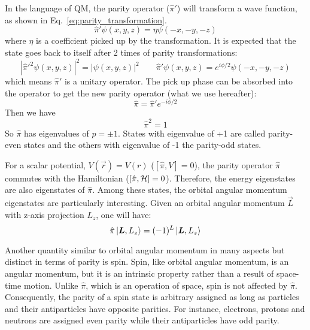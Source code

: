 In the language of QM, the parity operator ($\hat{\pi}'$) will transform 
a wave function, as shown in Eq.~\ref{eq:parity_transformation}.
\begin{equation}
    \hat{\pi}'\psi(x, y, z) = \eta \psi(-x, -y, -z)
    \label{eq:parity_transformation}
\end{equation}
where $\eta$ is a coefficient picked up by the transformation. It is expected that
the state goes back to itself after 2 times of parity transformations:
\begin{equation}
    |\hat{\pi}'^2 \psi(x, y, z)|^2 = |\psi(x, y, z)|^2
    \qquad
    \hat{\pi}'\psi(x, y, z) = e^{i\phi/2}\psi(-x, -y, -z)
\end{equation}
which means $\hat{\pi}'$ is a unitary operator. The pick up phase can
be absorbed into the operator to get the new parity operator (what we use hereafter): 
\begin{equation}
    \hat{\pi} = \hat{\pi}'e^{-i\phi/2}
\end{equation}
Then we have
\begin{equation}
    \hat{\pi}^2 = 1 
\end{equation}
So $\hat{\pi}$ has eigenvalues of $p = \pm 1$. States with eigenvalue of +1 are called
parity-even states and the others with eigenvalue of -1 the parity-odd states.

For a scalar potential, $V(\vec{r}) = V(r)$ ($[\hat{\pi}, V] = 0$), the parity 
operator $\hat{\pi}$ commutes with the Hamiltonian ($[\hat{\pi}, \mathcal{H}] = 0$). 
Therefore, the energy eigenstates are also eigenstates of $\hat{\pi}$. 
Among these states, the orbital angular momentum eigenstates are
particularly interesting. Given an orbital angular momentum $\vec{L}$ with z-axis projection
$L_z$, one will have:
\begin{equation}
    \hat{\pi}\ket{\boldsymbol{L}, L_z} = (-1)^L\ket{\boldsymbol{L}, L_z}
\end{equation}

Another quantity similar to orbital angular momentum in many aspects but
distinct in terms of parity is spin. Spin, like orbital angular momentum, 
is an angular momentum, but it is an intrinsic property rather than a result
of space-time motion. Unlike $\hat{\pi}$, which is an operation of space, 
spin is not affected by $\hat{\pi}$. Consequently, the parity of a spin state
is arbitrary assigned as long as particles and their antiparticles have opposite
parities. For instance, electrons, protons and neutrons are assigned even parity 
while their antiparticles have odd parity.

